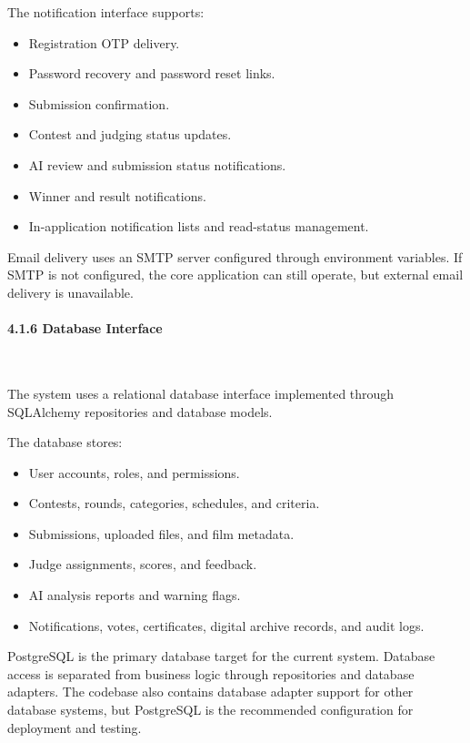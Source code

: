 The notification interface supports:

\begin{itemize}[leftmargin=1.5em, nosep]
    \item Registration OTP delivery.
    \item Password recovery and password reset links.
    \item Submission confirmation.
    \item Contest and judging status updates.
    \item AI review and submission status notifications.
    \item Winner and result notifications.
    \item In-application notification lists and read-status management.
\end{itemize}

Email delivery uses an SMTP server configured through environment variables. If SMTP is not configured, the core application can still operate, but external email delivery is unavailable.

\paragraph*{4.1.6 Database Interface}\leavevmode\\[-0.5em]
\label{par:database-interface}

The system uses a relational database interface implemented through SQLAlchemy repositories and database models.

The database stores:

\begin{itemize}[leftmargin=1.5em, nosep]
    \item User accounts, roles, and permissions.
    \item Contests, rounds, categories, schedules, and criteria.
    \item Submissions, uploaded files, and film metadata.
    \item Judge assignments, scores, and feedback.
    \item AI analysis reports and warning flags.
    \item Notifications, votes, certificates, digital archive records, and audit logs.
\end{itemize}

PostgreSQL is the primary database target for the current system. Database access is separated from business logic through repositories and database adapters. The codebase also contains database adapter support for other database systems, but PostgreSQL is the recommended configuration for deployment and testing.

